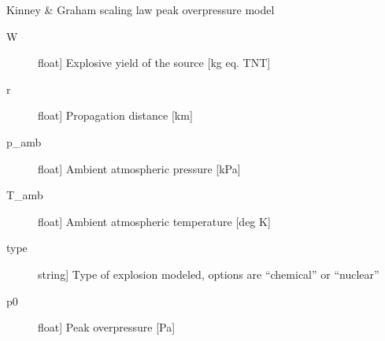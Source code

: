 \documentclass[letterpaper,10pt,english]{sphinxmanual}
\begin{document}

\begin{fulllineitems}
\label{\detokenize{infrapy.characterization:infrapy.characterization.spye.kg_op}}
Kinney \& Graham scaling law peak overpressure model
\begin{description}
\item[{W}] \leavevmode{[}float{]}
Explosive yield of the source {[}kg eq. TNT{]}

\item[{r}] \leavevmode{[}float{]}
Propagation distance {[}km{]}

\item[{p\_amb}] \leavevmode{[}float{]}
Ambient atmospheric pressure {[}kPa{]}

\item[{T\_amb}] \leavevmode{[}float{]}
Ambient atmospheric temperature {[}deg K{]}

\item[{type}] \leavevmode{[}string{]}
Type of explosion modeled, options are “chemical” or “nuclear”

\end{description}
\begin{description}
\item[{p0}] \leavevmode{[}float{]}
Peak overpressure {[}Pa{]}

\end{description}

\end{fulllineitems}

\end{document}

